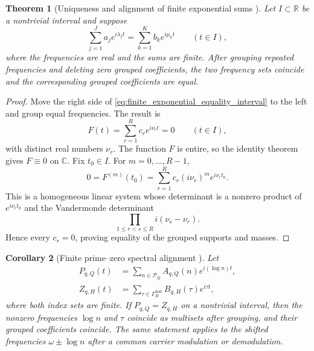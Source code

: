 \documentclass[11pt]{amsart}
\numberwithin{equation}{section}
\theoremstyle{plain}
\newtheorem{theorem}{Theorem}[section]
\newtheorem{corollary}[theorem]{Corollary}
\theoremstyle{definition}
\theoremstyle{remark}
\newcommand{\1}{\mathbf{1}}
\begin{document}
\begin{theorem}[Uniqueness and alignment of finite exponential sums {}]
\label{thm:finite_exponential_alignment}
Let \(I\subset\mathbb R\) be a nontrivial interval and suppose
\begin{equation}
\sum_{j=1}^{J}a_je^{i\lambda_jt}
=
\sum_{k=1}^{K}b_ke^{i\mu_kt}
\qquad(t\in I),
\label{eq:finite_exponential_equality_interval}
\end{equation}
where the frequencies are real and the sums are finite.  After grouping
repeated frequencies and deleting zero grouped coefficients, the two
frequency sets coincide and the corresponding grouped coefficients are
equal.
\end{theorem}

\begin{proof}
Move the right side of
\eqref{eq:finite_exponential_equality_interval} to the left and group equal
frequencies.  The result is
\begin{equation}
F(t)=\sum_{r=1}^{R}c_re^{i\nu_rt}=0
\qquad(t\in I),
\label{eq:finite_exponential_difference}
\end{equation}
with distinct real numbers \(\nu_r\).  The function \(F\) is entire, so the
identity theorem gives \(F\equiv0\) on \(\mathbb C\).  Fix
\(t_0\in I\).  For \(m=0,\ldots,R-1\),
\begin{equation}
0=F^{(m)}(t_0)
=
\sum_{r=1}^{R}c_r(i\nu_r)^me^{i\nu_rt_0}.
\label{eq:finite_exponential_derivatives}
\end{equation}
This is a homogeneous linear system whose determinant is a nonzero product
of \(e^{i\nu_rt_0}\) and the Vandermonde determinant
\begin{equation}
\prod_{1\leq r<s\leq R}i(\nu_s-\nu_r).
\label{eq:finite_exponential_vandermonde}
\end{equation}
Hence every \(c_r=0\), proving equality of the grouped supports and masses.
\end{proof}

\begin{corollary}[Finite prime--zero spectral alignment {}]
\label{cor:finite_prime_zero_alignment}
Let
\begin{align}
P_{q,Q}(t)
&=
\sum_{n\in\mathcal P_Q}A_{q,Q}(n)e^{i(\log n)t},
\label{eq:finite_prime_polynomial}
\\
Z_{q,H}(t)
&=
\sum_{\tau\in\Gamma_H^{\mathrm{dist}}}B_{q,H}(\tau)e^{i\tau t},
\label{eq:finite_zero_polynomial}
\end{align}
where both index sets are finite.  If \(P_{q,Q}=Z_{q,H}\) on a nontrivial
interval, then the nonzero frequencies \(\log n\) and \(\tau\) coincide as
multisets after grouping, and their grouped coefficients coincide.  The same
statement applies to the shifted frequencies \(\omega\pm\log n\) after a
common carrier modulation or demodulation.
\end{corollary}
\end{document}
